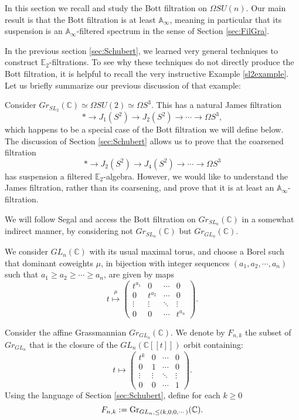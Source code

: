 In this section we recall and study the Bott filtration \cite{MitchellLoopGroup} on $\Omega SU(n)$.  Our main result is that the Bott filtration is at least $\mathbb{A}_\infty$, meaning in particular that its suspension is an $\mathbb{A}_\infty$-filtered spectrum in the sense of Section \ref{sec:FilGra}.

In the previous section \ref{sec:Schubert}, we learned very general techniques to construct $\mathbb{E}_2$-filtrations.  To see why these techniques do not directly produce the Bott filtration, it is helpful to recall the very instructive Example \ref{sl2example}.  Let us briefly summarize our previous discussion of that example:

\begin{rmk}
Consider $Gr_{SL_2}(\mathbb{C}) \simeq \Omega SU(2) \simeq \Omega S^3$.  This has a natural James filtration
$$* \longrightarrow J_1(S^2) \longrightarrow J_2(S^2) \longrightarrow \cdots \longrightarrow \Omega S^3,$$
which happens to be a special case of the Bott filtration we will define below.
The discussion of Section \ref{sec:Schubert} allows us to prove that the coarsened filtration
$$* \longrightarrow J_2(S^2) \longrightarrow J_4(S^2) \longrightarrow \cdots \longrightarrow \Omega S^3$$
has suspension a filtered $\mathbb{E}_2$-algebra.  However, we would like to understand the James filtration, rather than its coarsening, and prove that it is at least an $\mathbb{A}_\infty$-filtration.
\end{rmk}

We will follow Segal \cite{Segal} and access the Bott filtration on $Gr_{SL_n}(\mathbb{C})$ in a somewhat indirect manner, by considering not $Gr_{SL_n}(\mathbb{C})$ but $Gr_{GL_n}(\mathbb{C})$.

We consider $GL_n(\mathbb{C})$ with its usual maximal torus, and choose a Borel such that dominant coweights $\mu$, in bijection with integer sequences $(a_1,a_2,\cdots,a_n)$ such that $a_1 \ge a_2 \ge \cdots \ge a_n$, are given by maps
$$t \stackrel{\mu}{\mapsto} \left( \begin{array}{cccc} t^{a_1} & 0 & \cdots & 0 \\ 0 & t^{a_2} & \cdots & 0 \\ \vdots & \vdots & \ddots & \vdots \\ 0 & 0 & \cdots & t^{a_n} \end{array} \right).$$

\begin{dfn}
Consider the affine Grassmannian $Gr_{GL_n}(\mathbb{C})$.  We denote by $F_{n,k}$ the subset of $Gr_{GL_n}$ that is the closure of the $GL_n(\mathbb{C}[[t]])$ orbit containing:
$$t \mapsto \left( \begin{array}{cccc} t^k & 0 & \cdots & 0 \\ 0 & 1 & \cdots & 0 \\ \vdots & \vdots & \ddots & \vdots \\ 0 & 0 & \cdots & 1 \end{array} \right).$$
Using the language of Section \ref{sec:Schubert}, define for each $k\geq 0$
$$F_{n,k}  :=  \operatorname{\mathrm{Gr}}_{GL_n, \leq (k,0,0,\cdots)}(\mathbb{C}).$$
\end{dfn}

